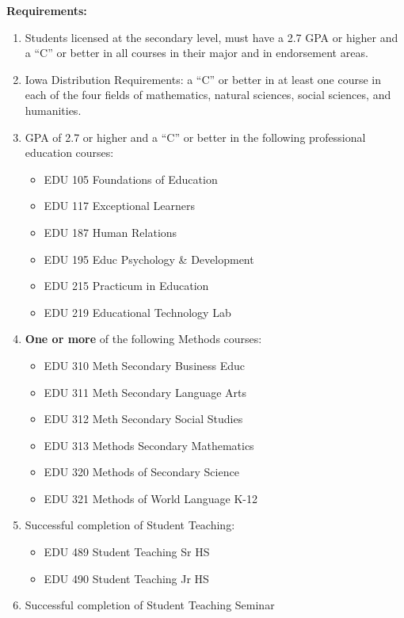 \documentclass[
  letterpaper,
]{scrbook}
\providecommand{\tightlist}{%
  \setlength{\itemsep}{0pt}\setlength{\parskip}{0pt}}
\begin{document}
\textbf{Requirements:}

\begin{enumerate}
\def\labelenumi{\arabic{enumi}.}
\tightlist
\item
  Students licensed at the secondary level, must have a 2.7 GPA or
  higher and a ``C'' or better in all courses in their major and in
  endorsement areas.
\item
  Iowa Distribution Requirements: a ``C'' or better in at least one
  course in each of the four fields of mathematics, natural sciences,
  social sciences, and humanities.
\item
  GPA of 2.7 or higher and a ``C'' or better in the following
  professional education courses:

  \begin{itemize}
  \tightlist
  \item
    EDU 105 Foundations of Education
  \item
    EDU 117 Exceptional Learners
  \item
    EDU 187 Human Relations
  \item
    EDU 195 Educ Psychology \& Development
  \item
    EDU 215 Practicum in Education
  \item
    EDU 219 Educational Technology Lab
  \end{itemize}
\item
  \textbf{One or more} of the following Methods courses:

  \begin{itemize}
  \tightlist
  \item
    EDU 310 Meth Secondary Business Educ
  \item
    EDU 311 Meth Secondary Language Arts
  \item
    EDU 312 Meth Secondary Social Studies
  \item
    EDU 313 Methods Secondary Mathematics
  \item
    EDU 320 Methods of Secondary Science
  \item
    EDU 321 Methods of World Language K-12
  \end{itemize}
\item
  Successful completion of Student Teaching:

  \begin{itemize}
  \tightlist
  \item
    EDU 489 Student Teaching Sr HS
  \item
    EDU 490 Student Teaching Jr HS
  \end{itemize}
\item
  Successful completion of Student Teaching Seminar


\end{enumerate}
\end{document}
